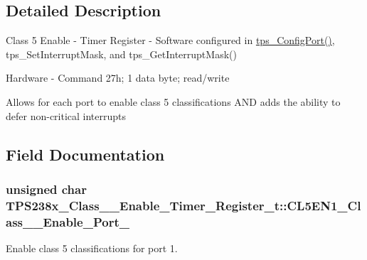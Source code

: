 \subsection{Detailed Description}
Class 5 Enable -\/ Timer Register -\/ Software configured in \hyperlink{_t_p_s23861_8c_a2b787818ef7e374af218c952d3ca8a08}{tps\-\_\-\-Config\-Port()}, tps\-\_\-\-Set\-Interrupt\-Mask, and tps\-\_\-\-Get\-Interrupt\-Mask() \par
 Hardware -\/ Command 27h; 1 data byte; read/write \par
\par
 Allows for each port to enable class 5 classifications A\-N\-D adds the ability to defer non-\/critical interrupts 

\subsection{Field Documentation}
\hypertarget{struct_t_p_s238x___class__5___enable___timer___register__t_adda0a59e6072df361b48a697607fa9a1}{
\subsubsection[{C\-L5\-E\-N1\-\_\-\-Class\-\_\-5\-\_\-\-Enable\-\_\-\-Port\-\_\-1}]{\setlength{\rightskip}{0pt plus 5cm}unsigned char T\-P\-S238x\-\_\-\-Class\-\_\-\_\-\-Enable\-\_\-\-Timer\-\_\-\-Register\-\_\-t\-::\-C\-L5\-E\-N1\-\_\-\-Class\-\_\-\_\-\-Enable\-\_\-\-Port\-\_}}\label{struct_t_p_s238x___class__5___enable___timer___register__t_adda0a59e6072df361b48a697607fa9a1}


Enable class 5 classifications for port 1. 

